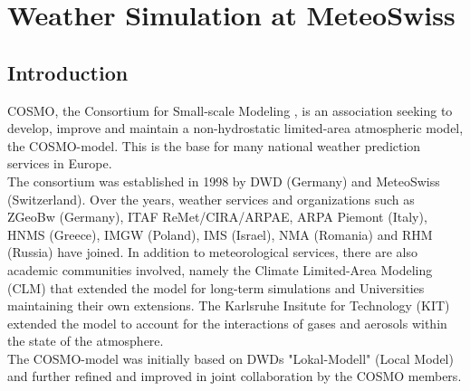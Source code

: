 \chapter{Weather Simulation at MeteoSwiss}


\section{Introduction}
COSMO, the Consortium for Small-scale Modeling \cite{label47}, is an association seeking to develop, improve and maintain a non-hydrostatic limited-area atmospheric model, the COSMO-model. This is the base for many national weather prediction services in Europe. \\
The consortium was established in 1998 by DWD (Germany) and MeteoSwiss (Switzerland). Over the years, weather services and organizations such as ZGeoBw (Germany), ITAF ReMet/CIRA/ARPAE, ARPA Piemont (Italy), HNMS (Greece), IMGW (Poland), IMS (Israel), NMA (Romania) and RHM (Russia) have joined. In addition to meteorological services, there are also academic communities involved, namely the Climate Limited-Area Modeling (CLM) that extended the model for long-term simulations and Universities maintaining their own extensions. The Karlsruhe Insitute for Technology (KIT) extended the model to account for the interactions of gases and aerosols within the state of the atmosphere. \\
The COSMO-model was initially based on DWDs "Lokal-Modell" (Local Model) and further refined and improved in joint collaboration by the COSMO members.


